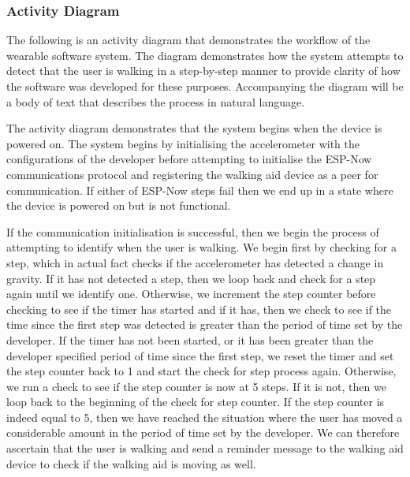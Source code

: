                 \newpage

            \subsubsection{Activity Diagram}
            \label{subsubsec:wearable_activity}

                The following is an activity diagram that demonstrates the workflow of the wearable software system. The diagram demonstrates how the system attempts to detect that the user is walking in a step-by-step manner to provide clarity of how the software was developed for these purposes. Accompanying the diagram will be a body of text that describes the process in natural language.

                

                The activity diagram demonstrates that the system begins when the device is powered on. The system begins by initialising the accelerometer with the configurations of the developer before attempting to initialise the ESP-Now communications protocol and registering the walking aid device as a peer for communication. If either of ESP-Now steps fail then we end up in a state where the device is powered on but is not functional. 

                If the communication initialisation is successful, then we begin the process of attempting to identify when the user is walking. We begin first by checking for a step, which in actual fact checks if the accelerometer has detected a change in gravity. If it has not detected a step, then we loop back and check for a step again until we identify one. Otherwise, we increment the step counter before checking to see if the timer has started and if it has, then we check to see if the time since the first step was detected is greater than the period of time set by the developer. If the timer has not been started, or it has been greater than the developer specified period of time since the first step, we reset the timer and set the step counter back to 1 and start the check for step process again. Otherwise, we run a check to see if the step counter is now at 5 steps. If it is not, then we loop back to the beginning of the check for step counter. If the step counter is indeed equal to 5, then we have reached the situation where the user has moved a considerable amount in the period of time set by the developer. We can therefore ascertain that the user is walking and send a reminder message to the walking aid device to check if the walking aid is moving as well.

